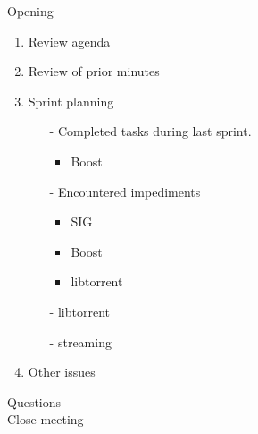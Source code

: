 \documentclass[pdftex, 12pt, a4paper]{report}
\begin{document}
\pagestyle{fancy}

Opening

\begin{enumerate}
\item Review agenda			
\item Review of prior minutes
\item Sprint planning
\begin{enumerate}
\item[-] Completed tasks during last sprint.
	\begin{itemize}
	\item Boost
	\end{itemize}
\item[-] Encountered impediments
	\begin{itemize}
	\item SIG
	\item Boost
	\item libtorrent
	\end{itemize}
\item[-] libtorrent
\item[-] streaming
\end{enumerate}
\item Other issues
\end{enumerate}

Questions\\

Close meeting
\end{document}
